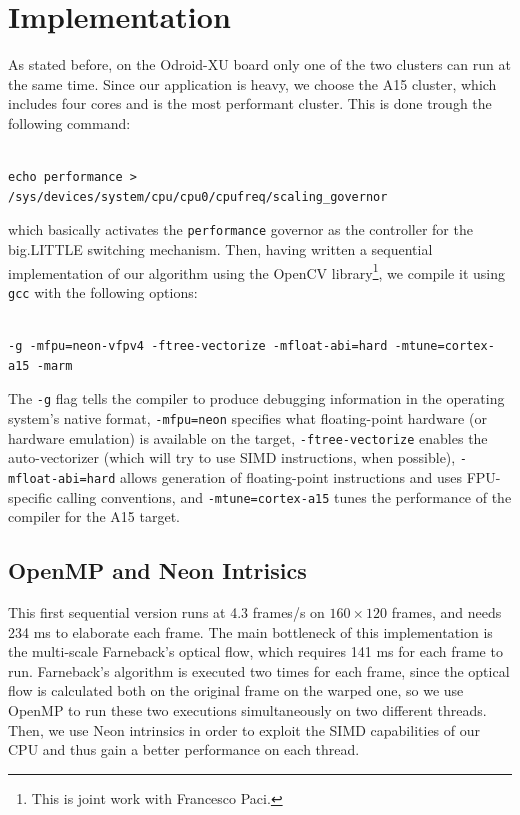 \section{Implementation}
\lstset{language=C++}

As stated before, on the Odroid-XU board only one of the two clusters can run at the same time. Since our application is heavy, we choose the A15 cluster, which includes four cores and is the most performant cluster. This is done trough the following command:
\begin{lstlisting}[frame=single]  % Start your code-block

echo performance > /sys/devices/system/cpu/cpu0/cpufreq/scaling_governor
\end{lstlisting}
which basically activates the \verb+performance+ governor as the controller for the big.LITTLE switching mechanism.
Then, having written a sequential implementation of our algorithm using the OpenCV library\footnote{This is joint work with Francesco Paci.}, we compile it using \verb+gcc+ with the following options:
\begin{lstlisting}[frame=single]  % Start your code-block

-g -mfpu=neon-vfpv4 -ftree-vectorize -mfloat-abi=hard -mtune=cortex-a15 -marm
\end{lstlisting}

The \verb+-g+ flag tells the compiler to produce debugging information in the operating system's native format, \verb+-mfpu=neon+  specifies what floating-point hardware (or hardware emulation) is available on the target, \verb+-ftree-vectorize+ enables the auto-vectorizer (which will try to use SIMD instructions, when possible), \verb+-mfloat-abi=hard+ allows generation of floating-point instructions and uses FPU-specific calling conventions, and \verb+-mtune=cortex-a15+ tunes the performance of the compiler for the A15 target.

\subsection{OpenMP and Neon Intrisics}
This first sequential version runs at 4.3 frames/s on $160\times 120$ frames, and needs 234 ms to elaborate each frame. The main bottleneck of this implementation is the multi-scale Farneback's optical flow, which requires 141 ms for each frame to run. Farneback's algorithm is executed two times for each frame, since the optical flow is calculated both on the original frame on the warped one, so we use OpenMP to run these two executions simultaneously on two different threads. Then, we use Neon intrinsics in order to exploit the SIMD capabilities of our CPU and thus gain a better performance on each thread.

